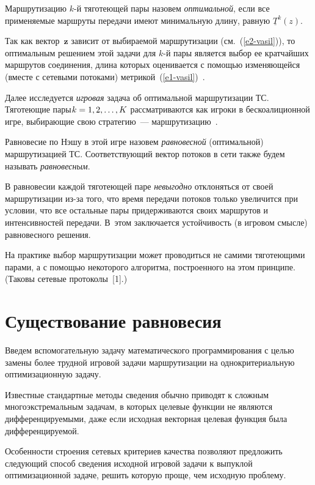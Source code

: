 \begin{multicols}{2}
  Маршрутизацию $k$-й тяготеющей пары назовем \textit{оптимальной}, если все 
применяемые маршруты передачи имеют минимальную длину, равную 
$\underline{T}^k(z)$.
  
  Так как вектор~$\mathbf{z}$ зависит от выбираемой маршрутизации 
(см.~(\ref{e2-vasil})), то оптимальным решением этой задачи для $k$-й пары 
является выбор ее кратчайших маршрутов соединения, длина которых оценивается 
с помощью изменяющейся (вместе с сетевыми потоками) 
  мет\-ри\-кой~(\ref{e1-vasil})~\cite{5-vasil, 6-vasil, 10-vasil}.
  
  Далее исследуется \textit{игровая} задача об оп\-ти\-мальной маршрутизации ТС. 
Тяготеющие пары\linebreak $k\hm= 1, 2, \ldots , K$ рассматриваются как игроки в 
бескоалиционной игре, выбирающие свою стратегию~--- 
  маршрутизацию~\cite{2-vasil, 4-vasil, 7-vasil}.
  
  Равновесие по Нэшу в этой игре назовем \textit{равновесной} (оптимальной) 
маршрутизацией ТС. Соответствующий вектор потоков в сети также будем 
называть \textit{равновесным}. 
  
  В равновесии каждой тяготеющей паре \textit{невыгодно} отклоняться от своей 
маршрутизации из-за того, что время передачи потоков только увеличится при 
условии, что все остальные пары придерживаются своих маршрутов и 
интенсивностей передачи. В~этом заключается устойчивость (в игровом смыс\-ле) 
равновесного решения.
  
  На практике выбор маршрутизации может проводиться не самими тяготеющими 
парами, а с по\-мощью некоторого алгоритма, построенного на этом принципе. 
(Таковы сетевые протоколы~[1].)
  
  \section{Существование равновесия}

  Введем вспомогательную задачу математического программирования с целью 
замены более трудной игровой задачи маршрутизации на однокритериальную 
оптимизационную задачу. 
  
  Известные стандартные методы сведения обычно приводят к сложным 
многоэкстремальным задачам, в которых целевые функции не являются 
дифференцируемыми, даже если исходная векторная целевая функция была 
дифференцируемой. 
  
  Особенности строения сетевых критериев ка\-чества позволяют предложить 
следующий способ сведения исходной игровой задачи к выпуклой 
оптимизационной задаче, решить которую проще, чем исходную проблему. 
  

\end{multicols}
